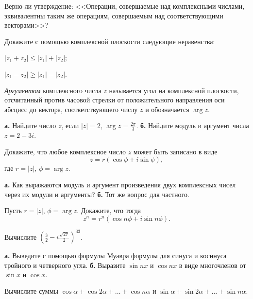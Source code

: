 \documentclass[a4paper, 12pt, num=21]{listok}
\begin{document}
\begin{problem}
	Верно ли утверждение: <<Операции, совершаемые над комплексными числами, эквивалентны таким же операциям, совершаемым над соответствующими векторами>>?
\end{problem}
\begin{problem}
	Докажите с помощью комплексной плоскости следующие неравенства:
	\begin{multienum}{2}
		\item  $|z_1 + z_2| \le |z_1| + |z_2|$;
		\item  $|z_1 - z_2| \ge |z_1| - |z_2|$.
	\end{multienum}
\end{problem}
\begin{definition}
	\textit{Аргументом} комплексного числа $z$ называется угол на комплексной плоскости,
	отсчитанный против часовой стрелки от положительного направления оси абсцисс до вектора,
	соответствующего числу $z$ и обозначается $\arg z$.
\end{definition}
\begin{problem}
	\textbf{а.} Найдите число $z$, если $|z| = 2$, $\arg z = \frac{2\pi}3$.
	\textbf{б.} Найдите модуль и аргумент числа $z = 2 - 3i$.
\end{problem}
\begin{problem}
	Докажите, что любое комплексное число $z$ может быть записано в виде
	\[
		z = r(\cos \phi + i \sin \phi),
	\]
	где $r = |z|$, $\phi = \arg z$.
\end{problem}
\begin{problem}
	\textbf{а.} Как выражаются модуль и аргумент произведения двух комплексных чисел через их модули и аргументы?
	\textbf{б.} Тот же вопрос для частного.
\end{problem}
\begin{problem}
	Пусть $r = |z|$, $\phi = \arg z$.
	Докажите, что тогда
	\[
		z^n = r^n (\cos{n\phi} + i \sin{n\phi}).
	\]
\end{problem}
\begin{problem}
	Вычислите ${\left ( \frac 3 2 - i \frac{\sqrt{27}}2 \right )}^{33}$.
\end{problem}
\begin{problem}
	\textbf{а.} Выведите с помощью формулы Муавра формулы для синуса и косинуса тройного и четверного угла.
	\textbf{б.} Выразите $\sin{nx}$ и $\cos{nx}$ в виде многочленов от $\sin x$ и $\cos x$.
\end{problem}
\begin{problem}
	Вычислите суммы $\cos \alpha + \cos{2\alpha} + \ldots + \cos{n\alpha}$ и $\sin \alpha + \sin{2\alpha} + \ldots + \sin{n\alpha}$.
\end{problem}
\end{document}
